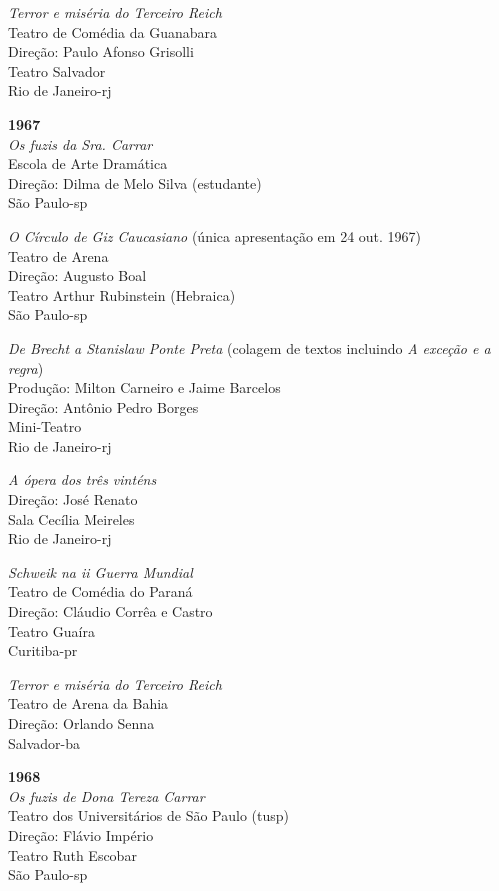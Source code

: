 {\it Terror e miséria do Terceiro Reich}\\
Teatro de Comédia da Guanabara\\
Direção: Paulo Afonso Grisolli\\
Teatro Salvador\\
Rio de Janeiro-{\sc rj}

\item{\bf 1967}\\
{\it Os fuzis da Sra. Carrar}\\
Escola de Arte Dramática\\
Direção: Dilma de Melo Silva (estudante)\\
São Paulo-{\sc sp}

{\it O Círculo de Giz Caucasiano} (única apresentação em 24 out. 1967)\\
Teatro de Arena\\
Direção: Augusto Boal\\
Teatro Arthur Rubinstein (Hebraica)\\
São Paulo-{\sc sp}

{\it De Brecht a Stanislaw Ponte Preta} (colagem de textos incluindo
{\it A exceção e a regra})\\
Produção: Milton Carneiro e Jaime Barcelos\\
Direção: Antônio Pedro Borges\\
Mini-Teatro\\
Rio de Janeiro-{\sc rj}

{\it A ópera dos três vinténs}\\
Direção: José Renato\\
Sala Cecília Meireles\\
Rio de Janeiro-{\sc rj}

{\it Schweik na {\sc ii} Guerra Mundial}\\
Teatro de Comédia do Paraná\\
Direção: Cláudio Corrêa e Castro\\
Teatro Guaíra\\
Curitiba-{\sc pr}

{\it Terror e miséria do Terceiro Reich}\\
Teatro de Arena da Bahia\\
Direção: Orlando Senna\\
Salvador-{\sc ba}

\item{\bf 1968}\\
{\it Os fuzis de Dona Tereza Carrar}\\
Teatro dos Universitários de São Paulo ({\sc tusp})\\
Direção: Flávio Império\\
Teatro Ruth Escobar\\
São Paulo-{\sc sp}

